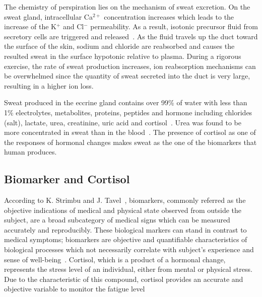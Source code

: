 \documentclass[journal]{IEEEtran}
\begin{document}
The chemistry of perspiration lies on the mechanism of sweat excretion. On the sweat gland, intracellular Ca$^{2+}$ concentration increases which leads to the increase of the K$^+$ and Cl$^-$ permeability. As a result, isotonic precursor fluid from secretory cells are triggered and released~\cite{PhysHumanPersp}. As the fluid travels up the duct toward the surface of the skin, sodium and chloride are reabsorbed and causes the resulted sweat in the surface hypotonic relative to plasma. During a rigorous exercise, the rate of sweat production increases, ion reabsorption mechanisms can be overwhelmed since the quantity of sweat secreted into the duct is very large, resulting in a higher ion loss. 

Sweat produced in the eccrine gland contains over 99\% of water with less than 1\% electrolytes, metabolites, proteins, peptides and hormone including chlorides (salt), lactate, urea, creatinine, uric acid and cortisol~\cite{CortisolEccrineSweat}. Urea was found to be more concentrated in sweat than in the blood~\cite{PhysHumanPersp}. The presence of cortisol as one of the responses of hormonal changes makes sweat as the one of the biomarkers that human produces. 

\subsection{Biomarker and Cortisol}

According to K. Strimbu and J. Tavel~\cite{biomarkers}, biomarkers, commonly referred as the objective indications of medical and physical state observed from outside the subject, are a broad subcategory of medical signs which can be measured accurately and reproducibly. These biological markers can stand in contrast to medical symptoms; biomarkers are objective and quantifiable characteristics of biological processes which not necessarily correlate with subject’s experience and sense of well-being~\cite{biomarkers}. Cortisol, which is a product of a hormonal change, represents the stress level of an individual, either from mental or physical stress. Due to the characteristic of this compound, cortisol provides an accurate and objective variable to monitor the fatigue level~\cite{UHMWPEMembrane}
\end{document}
